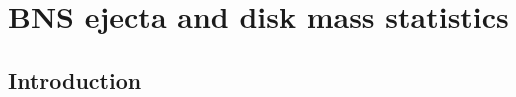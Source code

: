 
\chapter{\ac{BNS} ejecta and disk mass statistics} %

\label{ch:stat} %

%





\section{Introduction}

%











